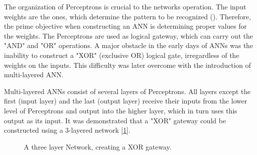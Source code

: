	The organization of Perceptrons is crucial to the networks operation. The input weights are the ones, which determine the pattern to be recognized (\cite{bishop1995neural}). Therefore, the prime objective when constructing an ANN is determining proper values for the weights. The Perceptrons are used as logical gateway, which can carry out the "AND" and "OR" operations. A major obstacle in the early days of ANNs was the inability to construct  a "XOR" (exclusive OR) logical gate, irregardless of the weights on the inputs. This difficulty was later overcome with the introduction of multi-layered ANN.
	
	Multi-layered ANNs consist of several layers of Perceptrons. All layers except the first (input layer) and the last (output layer) receive their inputs from the lower level of Perceptrons and output into the higher layer, which in turn uses this output as its input. It was demonstrated that a "XOR" gateway could be constructed using a 3-layered network [\ref{ANN_XOR}].
	
	\begin{figure}[h]
		\captionsetup{width=0.8\textwidth}
		\caption[ANN XOR Perceptron-Network]{
			\footnotesize{
				A three layer Network, creating a XOR gateway.
			}
		} 
		\label{ANN_XOR}
	\end{figure}	
	
	
